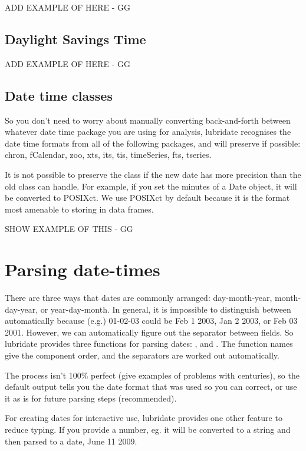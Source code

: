 \documentclass[article]{jss}
\begin{document}
ADD EXAMPLE OF HERE - GG

\subsection{Daylight Savings Time}
\label{sec:DST}

ADD EXAMPLE OF HERE - GG


\subsection{Date time classes}

So you don't need to worry about manually converting back-and-forth between whatever date time package you are using for analysis, lubridate recognises the date time formats from all of the following packages, and will preserve if possible: chron, fCalendar, zoo, xts, its, tis, timeSeries, fts, tseries.

It is not possible to preserve the class if the new date has more precision than the old class can handle.  For example, if you set the minutes of a Date object, it will be converted to POSIXct.  We use POSIXct by default because it is the format most amenable to storing in data frames.

SHOW EXAMPLE OF THIS - GG

\section{Parsing date-times}
\label{sec:parsing}

There are three ways that dates are commonly arranged: day-month-year, month-day-year, or year-day-month. In general, it is impossible to distinguish between automatically because (e.g.) 01-02-03 could be Feb 1 2003, Jan 2 2003, or Feb 03 2001.  However, we can automatically figure out the separator between fields.  So lubridate provides three functions for parsing dates: ,  and .  The function names give the component order, and the separators are worked out automatically.  

The process isn't 100\% perfect (give examples of problems with centuries), so the default output tells you the date format that was used so you can correct, or use it as is for future parsing steps (recommended).

For creating dates for interactive use, lubridate provides one other feature to reduce typing.  If you provide a number, eg.  it will be converted to a string  and then parsed to a date, June 11 2009.  
\end{document}
